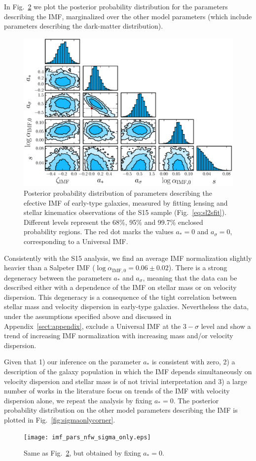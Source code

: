 \documentclass[usenatbib]{mnras}
\def\Fref#1{Fig.~\ref{#1}\xspace}
\begin{document}
In \Fref{fig:sl2scorner} we plot the posterior probability distribution for the parameters describing the IMF, marginalized over the other model parameters (which include parameters describing the dark-matter distribution).
%
\begin{figure}
 \includegraphics[width=\textwidth]{imf_pars_nfw_msps_sigma.eps}
 \caption{Posterior probability distribution of parameters describing
   the efective IMF of early-type galaxies, measured by fitting
   lensing and stellar kinematics observations of the S15 sample
   (\Fref{eq:sl2sfit}). Different levels represent the 68\%, 95\% and
   99.7\% enclosed probability regions.
The red dot marks the values $a_*=0$ and $a_\sigma=0$, corresponding to a Universal IMF.
}
 \label{fig:sl2scorner}
\end{figure}
%
Consistently with the S15 analysis, we find an average IMF
normalization slightly heavier than a Salpeter IMF
($\log{\alpha_{\mathrm{IMF},0}} = 0.06\pm0.02$). There is a strong
degeneracy between the parameters $a_*$ and $a_\sigma$, meaning that
the data can be described either with a dependence of the IMF on
stellar mass or on velocity dispersion. This degeneracy is a
consequence of the tight correlation between stellar mass and velocity
dispersion in early-type galaxies.  Nevertheless the data, under the
assumptions specified above and discussed in
Appendix~\ref{sect:appendix}, exclude a Universal IMF at the
$3-\sigma$ level and show a trend of increasing IMF normalization with
increasing mass and/or velocity dispersion.

Given that 1) our inference on the parameter $a_*$ is consistent with zero, 2) a description of the galaxy population in which the IMF depends simultaneously on velocity dispersion and stellar mass is of not trivial interpretation and 3) a large number of works in the literature focus on trends of the IMF with velocity dispersion alone, we repeat the analysis by fixing $a_*=0$. The posterior probability distribution on the other model parameters describing the IMF is plotted in \Fref{fig:sigmaonlycorner}. 
%
\begin{figure}
 \texttt{[image: imf\_pars\_nfw\_sigma\_only.eps]}
 \caption{
Same as \Fref{fig:sl2scorner}, but obtained by fixing $a_*=0$.
}
 \label{fig:sl2scorner}
\end{figure}
%
\end{document}
